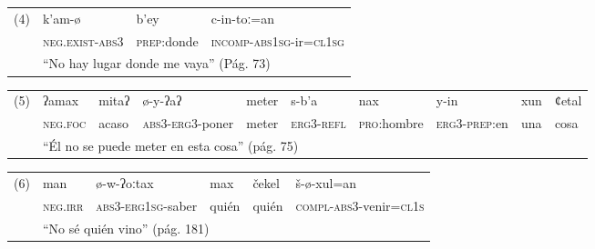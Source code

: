 {      %
      \noindent \begin{tabular}{llll}
            (4) & k'am-ø                                                     & b'ey                & c-in-toː=an                            \\
                & \textsc{neg.exist-abs3}                                    & \textsc{prep}:donde & \textsc{incomp-abs1sg}-ir=\textsc{cl1sg} \\
                & \multicolumn{3}{l}{“No hay lugar donde me vaya” (Pág. 73)}                                                                \\
      \end{tabular} \vspace{0.25cm}

      {\small
      \noindent \begin{tabular}{llllllllll}
            (5) & ʔamax                                                             & mitaʔ & ø-y-ʔaʔ                & meter & s-b'a            & nax                 & y-in                & xun & ȼetal \\
                & \textsc{neg.foc}                                                  & acaso & \textsc{abs3-erg3}-poner & meter & \textsc{erg3-refl} & \textsc{pro}:hombre & \textsc{erg3-prep}:en & una & cosa  \\
                & \multicolumn{9}{l}{“Él no se puede meter en esta cosa” (pág. 75)}                                                                                                                       \\
      \end{tabular} \vspace{0.25cm}
      }

      \noindent \begin{tabular}{llllll}
            (6) & man                                               & ø-w-ʔoːtax              & max   & čekel & š-ø-xul=an                              \\
                & \textsc{neg.irr}                                  & \textsc{abs3-erg1sg}-saber & quién & quién & \textsc{compl-abs3}-venir=\textsc{cl1s} \\
                & \multicolumn{5}{l}{“No sé quién vino” (pág. 181)}                                                                                     \\
      \end{tabular} \vspace{0.25cm}

}
